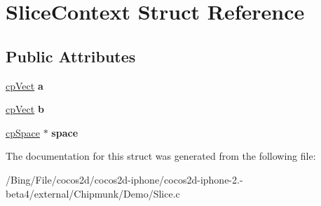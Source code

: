 \hypertarget{struct_slice_context}{\section{Slice\-Context Struct Reference}
\label{struct_slice_context}
}
\subsection*{Public Attributes}
\begin{DoxyCompactItemize}
\item 
\hypertarget{struct_slice_context_a9c505f6c606e4ae21f91b1cd13f1dafb}{\hyperlink{structcp_vect}{cp\-Vect} {\bfseries a}}\label{struct_slice_context_a9c505f6c606e4ae21f91b1cd13f1dafb}

\item 
\hypertarget{struct_slice_context_ab6521209480dfb8d3759a46492fda8c9}{\hyperlink{structcp_vect}{cp\-Vect} {\bfseries b}}\label{struct_slice_context_ab6521209480dfb8d3759a46492fda8c9}

\item 
\hypertarget{struct_slice_context_aaea5396b0f7b8d0b015cdc89ab9be7cf}{\hyperlink{structcp_space}{cp\-Space} $\ast$ {\bfseries space}}\label{struct_slice_context_aaea5396b0f7b8d0b015cdc89ab9be7cf}

\end{DoxyCompactItemize}


The documentation for this struct was generated from the following file\-:\begin{DoxyCompactItemize}
\item 
/\-Bing/\-File/cocos2d/cocos2d-\/iphone/cocos2d-\/iphone-\/2.-\/beta4/external/\-Chipmunk/\-Demo/Slice.\-c\end{DoxyCompactItemize}
